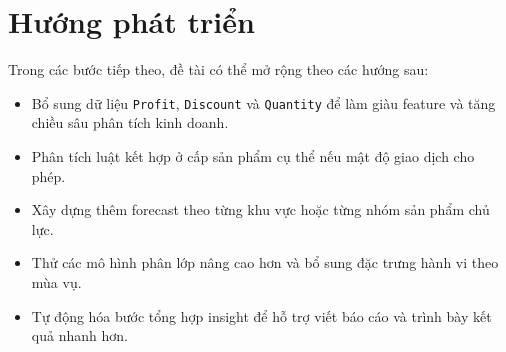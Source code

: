 \section{Hướng phát triển}

Trong các bước tiếp theo, đề tài có thể mở rộng theo các hướng sau:
\begin{itemize}
\item Bổ sung dữ liệu \texttt{Profit}, \texttt{Discount} và \texttt{Quantity} để làm giàu feature và tăng chiều sâu phân tích kinh doanh.
\item Phân tích luật kết hợp ở cấp sản phẩm cụ thể nếu mật độ giao dịch cho phép.
\item Xây dựng thêm forecast theo từng khu vực hoặc từng nhóm sản phẩm chủ lực.
\item Thử các mô hình phân lớp nâng cao hơn và bổ sung đặc trưng hành vi theo mùa vụ.
\item Tự động hóa bước tổng hợp insight để hỗ trợ viết báo cáo và trình bày kết quả nhanh hơn.
\end{itemize}
